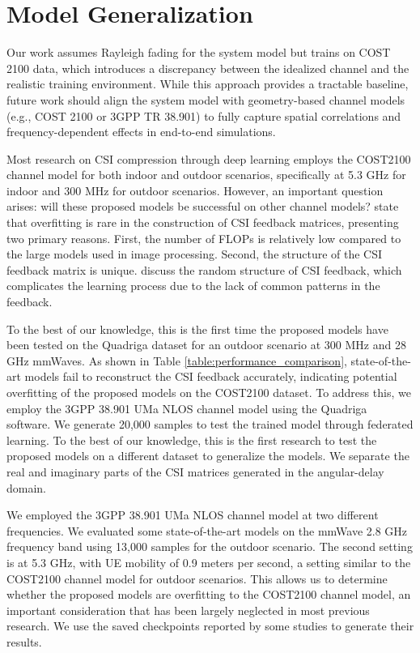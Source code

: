 \documentclass[lettersize,journal]{IEEEtran}
\begin{document}
\section{Model Generalization}


Our work assumes Rayleigh fading for the system model but trains on COST 2100 data, which introduces a discrepancy between the idealized channel and the realistic training environment. While this approach provides a tractable baseline, future work should align the system model with geometry-based channel models (e.g., COST 2100 or 3GPP TR 38.901) to fully capture spatial correlations and frequency-dependent effects in end-to-end simulations.

Most research on CSI compression through deep learning employs the COST2100 channel model for both indoor and outdoor scenarios, specifically at 5.3 GHz for indoor and 300 MHz for outdoor scenarios. However, an important question arises: will these proposed models be successful on other channel models?
\cite{abn} state that overfitting is rare in the construction of CSI feedback matrices, presenting two primary reasons. First, the number of FLOPs is relatively low compared to the large models used in image processing. Second, the structure of the CSI feedback matrix is unique. \cite{abx} discuss the random structure of CSI feedback, which complicates the learning process due to the lack of common patterns in the feedback.

To the best of our knowledge, this is the first time the proposed models have been tested on the Quadriga dataset for an outdoor scenario at 300 MHz and 28 GHz mmWaves. As shown in Table
 \ref{table:performance_comparison}, state-of-the-art models fail to reconstruct the CSI feedback accurately, indicating potential overfitting of the proposed models on the COST2100 dataset. To address this, we employ the 3GPP 38.901 UMa NLOS channel model using the Quadriga software. We generate 20,000 samples to test the trained model through federated learning. To the best of our knowledge, this is the first research to test the proposed models on a different dataset to generalize the models. We separate the real and imaginary parts of the CSI matrices generated in the angular-delay domain.

We employed the 3GPP 38.901 UMa NLOS channel model at two different frequencies. We evaluated some state-of-the-art models on the mmWave 2.8 GHz frequency band using 13,000 samples for the outdoor scenario. The second setting is at 5.3 GHz, with UE mobility of 0.9 meters per second, a setting similar to the COST2100 channel model for outdoor scenarios. This allows us to determine whether the proposed models are overfitting to the COST2100 channel model, an important consideration that has been largely neglected in most previous research. We use the saved checkpoints reported by some studies to generate their results.
\end{document}
